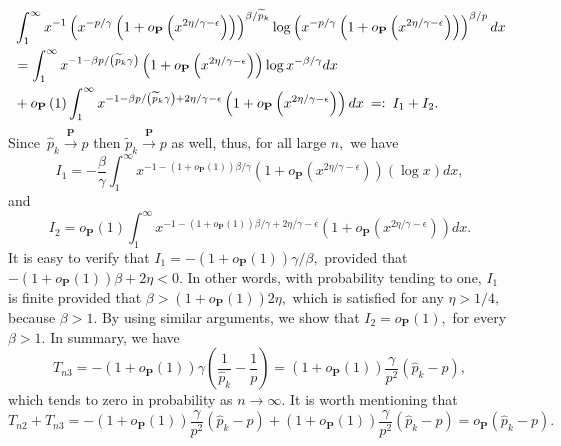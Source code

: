 \documentclass[reqno,openbib,runningheads,a4paper,12pt]{amsart}%
\begin{document}
\begin{align*}
&  \int_{1}^{\infty}x^{-1}\left(  x^{-p/\gamma}\left(  1+o_{\mathbf{P}}\left(
x^{2\eta/\gamma-\epsilon}\right)  \right)  \right)  ^{\beta/\widetilde{p}_{k}%
}\log\left(  x^{-p/\gamma}\left(  1+o_{\mathbf{P}}\left(  x^{2\eta
/\gamma-\epsilon}\right)  \right)  \right)  ^{\beta/p}dx\\
&  =\int_{1}^{\infty}x^{-1-\beta p/\left(  \widetilde{p}_{k}\gamma\right)
}\left(  1+o_{\mathbf{P}}\left(  x^{2\eta/\gamma-\epsilon}\right)  \right)
\log x^{-\beta/\gamma}dx\\
&  +o_{\mathbf{P}}\left(  1\right)  \int_{1}^{\infty}x^{-1-\beta p/\left(
\widetilde{p}_{k}\gamma\right)  +2\eta/\gamma-\epsilon}\left(  1+o_{\mathbf{P}%
}\left(  x^{2\eta/\gamma-\epsilon}\right)  \right)  dx%
\begin{array}
[c]{c}%
=:
\end{array}
I_{1}+I_{2}.
\end{align*}
Since~$\widehat{p}_{k}\overset{\mathbf{P}}{\rightarrow}p$ then $\widetilde{p}%
_{k}\overset{\mathbf{P}}{\rightarrow}p$ as well, thus, for all large $n,$ we
have%
\[
I_{1}=-\frac{\beta}{\gamma}\int_{1}^{\infty}x^{-1-\left(  1+o_{\mathbf{P}%
}\left(  1\right)  \right)  \beta/\gamma}\left(  1+o_{\mathbf{P}}\left(
x^{2\eta/\gamma-\epsilon}\right)  \right)  \left(  \log x\right)  dx,
\]
and
\[
I_{2}=o_{\mathbf{P}}\left(  1\right)  \int_{1}^{\infty}x^{-1-\left(
1+o_{\mathbf{P}}\left(  1\right)  \right)  \beta/\gamma+2\eta/\gamma-\epsilon
}\left(  1+o_{\mathbf{P}}\left(  x^{2\eta/\gamma-\epsilon}\right)  \right)
dx.
\]
It is easy to verify that $I_{1}=-\left(  1+o_{\mathbf{P}}\left(  1\right)
\right)  \gamma/\beta,$ provided that $-\left(  1+o_{\mathbf{P}}\left(
1\right)  \right)  \beta+2\eta<0.$ In other words, with probability tending to
one, $I_{1}$ is finite provided that $\beta>\left(  1+o_{\mathbf{P}}\left(
1\right)  \right)  2\eta,$ which is satisfied for any $\eta>1/4,$ because
$\beta>1.$ By using similar arguments, we show that $I_{2}=o_{\mathbf{P}%
}\left(  1\right)  ,$ for every $\beta>1.$ In summary, we have%
\[
T_{n3}=-\left(  1+o_{\mathbf{P}}\left(  1\right)  \right)  \gamma\left(
\frac{1}{\widehat{p}_{k}}-\frac{1}{p}\right)  =\left(  1+o_{\mathbf{P}}\left(
1\right)  \right)  \frac{\gamma}{p^{2}}\left(  \widehat{p}_{k}-p\right)  ,
\]
which tends to zero in probability as $n\rightarrow\infty.$ It is worth
mentioning that%
\begin{equation}
T_{n2}+T_{n3}=-\left(  1+o_{\mathbf{P}}\left(  1\right)  \right)  \frac
{\gamma}{p^{2}}\left(  \widehat{p}_{k}-p\right)  +\left(  1+o_{\mathbf{P}%
}\left(  1\right)  \right)  \frac{\gamma}{p^{2}}\left(  \widehat{p}%
_{k}-p\right)  =o_{\mathbf{P}}\left(  \widehat{p}_{k}-p\right)  .
\label{Tn1-Tn2}%
\end{equation}
\end{document}
